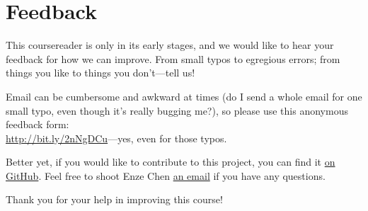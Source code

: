 %

%

\chapter{Feedback} \label{ch:feedback}

This coursereader is only in its early stages, and we would like to hear your feedback for how we can improve. From small typos to egregious errors; from things you like to things you don't---tell us! \par 

Email can be cumbersome and awkward at times (do I send a whole email for one small typo, even though it's really bugging me?), so please use this anonymous feedback form:\\ \url{http://bit.ly/2nNgDCu}---yes, even for those typos. \par 

Better yet, if you would like to contribute to this project, you can find it \href{https://github.com/Enze-Chen/mse_142_cr}{on GitHub}. Feel free to shoot Enze Chen \href{mailto:enze.chen1@gmail.com}{an email} if you have any questions. \par

Thank you for your help in improving this course! \par
%